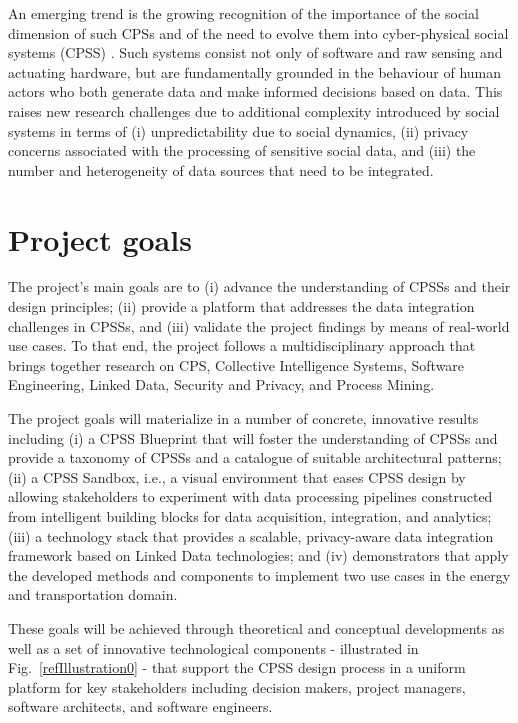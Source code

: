 \documentclass[runningheads,a4paper]{llncs}
\begin{document}
An emerging trend is the growing recognition of the importance of the social dimension of such CPSs and of the need to evolve them into cyber-physical social systems (CPSS)  \cite{__RefHeading__219_247691834}. Such systems consist not only of software and raw sensing and actuating hardware, but are fundamentally grounded in the behaviour of human actors who both generate data and make informed decisions based on data. This raises new research challenges due to additional complexity introduced by social systems in terms of (i) unpredictability due to social dynamics, (ii) privacy concerns associated with the processing of sensitive social data, and (iii) the number and heterogeneity of data sources that need to be integrated.

\section{Project goals}

The project's main goals are to (i) advance the understanding of CPSSs and their design principles; (ii) provide a platform that addresses the data integration challenges in CPSSs, and (iii) validate the project findings by means of real-world use cases. To that end, the project follows a multidisciplinary approach that brings together research on CPS, Collective Intelligence Systems, Software Engineering, Linked Data, Security and Privacy, and Process Mining. 

The project goals will materialize in a number of concrete, innovative results including (i) a CPSS Blueprint that will foster the understanding of CPSSs and provide a taxonomy of CPSSs and a catalogue of suitable architectural patterns; (ii) a CPSS Sandbox, i.e., a visual environment that eases CPSS design by allowing stakeholders to experiment with data processing pipelines constructed from intelligent building blocks for data acquisition, integration, and analytics; (iii) a technology stack that provides a scalable, privacy-aware data integration framework based on Linked Data technologies; and (iv) demonstrators that apply the developed methods and components to implement two use cases in the energy and transportation domain. 

These goals will be achieved through theoretical and conceptual developments as well as a set of innovative technological components - illustrated in Fig.~\ref{refIllustration0} - that support the CPSS design process in a uniform platform for key stakeholders including decision makers, project managers, software architects, and software engineers.
\end{document}
